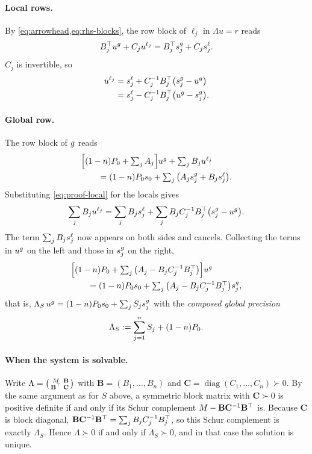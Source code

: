 \paragraph{Local rows.}
By \cref{eq:arrowhead,eq:rhs-blocks}, the row block of $\ell_j$ in $\Lambda u=r$ reads
\[
  B_j^\top u^{g}+C_ju^{\ell_j}=B_j^\top s_j^{g}+C_js_j^{\ell} .
\]
$C_j$ is invertible, so
\begin{equation}\label{eq:proof-local}
\begin{aligned}
  u^{\ell_j}&=s_j^{\ell}+C_j^{-1}B_j^\top\big(s_j^{g}-u^{g}\big)\\
      &=s_j^{\ell}-C_j^{-1}B_j^\top\big(u^{g}-s_j^{g}\big).
\end{aligned}
\end{equation}

\paragraph{Global row.}
The row block of $g$ reads
\[
\begin{aligned}
  &\Big[(1-n)P_{0}+\textstyle\sum_jA_j\Big]u^{g}+\textstyle\sum_jB_ju^{\ell_j}\\
  &\qquad=(1-n)P_{0} s_0+\textstyle\sum_j\big(A_js_j^{g}+B_js_j^{\ell}\big).
\end{aligned}
\]
Substituting \cref{eq:proof-local} for the locals gives
\[
  \sum_jB_ju^{\ell_j}=\sum_jB_js_j^{\ell}+\sum_jB_jC_j^{-1}B_j^\top\big(s_j^{g}-u^{g}\big).
\]
The term $\sum_jB_js_j^{\ell}$ now appears on both sides and cancels.
Collecting the terms in $u^{g}$ on the left and those in $s_j^{g}$ on the right,
\[
\begin{aligned}
  &\Big[(1-n)P_{0}+\textstyle\sum_j\big(A_j-B_jC_j^{-1}B_j^\top\big)\Big]u^{g}\\
  &\qquad=(1-n)P_{0} s_0+\textstyle\sum_j\big(A_j-B_jC_j^{-1}B_j^\top\big)s_j^{g},
\end{aligned}
\]
that is, $\Lambda_S\,u^{g}=(1-n)P_{0} s_0+\sum_jS_js_j^{g}$ with the \emph{composed global precision}
\begin{equation}\label{eq:composed-global-precision}
  \Lambda_S:=\sum_{j=1}^{n}S_j+(1-n)P_{0} .
\end{equation}

\paragraph{When the system is solvable.}
Write $\Lambda=\begin{psmallmatrix}M&\mathbf{B}\\\mathbf{B}^\top&\mathbf{C}\end{psmallmatrix}$ with $\mathbf{B}=(B_1,\dots,B_n)$ and $\mathbf{C}=\operatorname{diag}(C_1,\dots,C_n)\succ0$.
By the same argument as for $S$ above, a symmetric block matrix with $\mathbf{C}\succ0$ is positive definite if and only if its Schur complement $M-\mathbf{B}\mathbf{C}^{-1}\mathbf{B}^\top$ is.
Because $\mathbf{C}$ is block diagonal, $\mathbf{B}\mathbf{C}^{-1}\mathbf{B}^\top=\sum_jB_jC_j^{-1}B_j^\top$, so this Schur complement is exactly $\Lambda_S$.
Hence $\Lambda\succ0$ if and only if $\Lambda_S\succ0$, and in that case the solution is unique.


